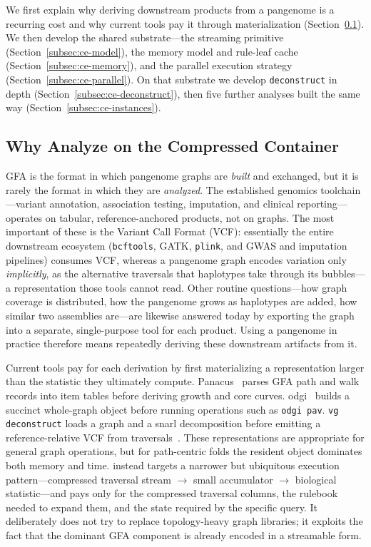 We first explain why deriving downstream products from a pangenome is a recurring
cost and why current tools pay it through materialization
(Section~\ref{subsec:ce-downstream}). We then develop the shared substrate---the
streaming primitive (Section~\ref{subsec:ce-model}), the memory model and rule-leaf
cache (Section~\ref{subsec:ce-memory}), and the parallel execution strategy
(Section~\ref{subsec:ce-parallel}). On that substrate we develop \texttt{deconstruct}
in depth (Section~\ref{subsec:ce-deconstruct}), then five further analyses built the
same way (Section~\ref{subsec:ce-instances}).

\subsection{Why Analyze on the Compressed Container}\label{subsec:ce-downstream}

GFA is the format in which pangenome graphs are \emph{built} and exchanged, but it
is rarely the format in which they are \emph{analyzed}. The established genomics
toolchain---variant annotation, association testing, imputation, and clinical
reporting---operates on tabular, reference-anchored products, not on graphs. The
most important of these is the Variant Call Format (VCF): essentially the entire
downstream ecosystem (\texttt{bcftools}, GATK, \texttt{plink}, and GWAS and
imputation pipelines) consumes VCF, whereas a pangenome graph encodes variation
only \emph{implicitly}, as the alternative traversals that haplotypes take through
its bubbles---a representation those tools cannot read. Other routine
questions---how graph coverage is distributed, how the pangenome grows as
haplotypes are added, how similar two assemblies are---are likewise answered today
by exporting the graph into a separate, single-purpose tool for each product. Using
a pangenome in practice therefore means repeatedly deriving these downstream
artifacts from it.

Current tools pay for each derivation by first materializing a representation larger
than the statistic they ultimately compute. Panacus~\cite{parmigiani2024panacus}
parses GFA path and walk records into item tables before deriving growth and core
curves. odgi~\cite{guarracino2022odgi} builds a succinct whole-graph object before
running operations such as \texttt{odgi pav}. \texttt{vg deconstruct} loads a graph
and a snarl decomposition before emitting a reference-relative VCF from
traversals~\cite{garrison2018variation,hickey2020genotyping}. These representations
are appropriate for general graph operations, but for path-centric folds the
resident object dominates both memory and time. \gfaz instead targets a narrower but
ubiquitous execution pattern---compressed traversal stream $\rightarrow$ small
accumulator $\rightarrow$ biological statistic---and pays only for the compressed
traversal columns, the rulebook needed to expand them, and the state required by the
specific query. It deliberately does not try to replace topology-heavy graph
libraries; it exploits the fact that the dominant GFA component is already encoded
in a streamable form.

